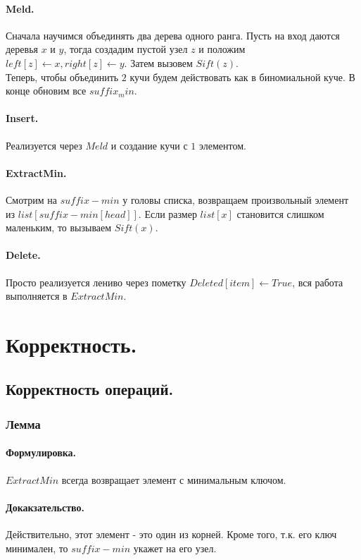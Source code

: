 \documentclass{article}
\begin{document}
		\paragraph{Meld.} 
		Сначала научимся объединять два дерева одного ранга. Пусть на вход даются деревья $x$ и $y$, тогда создадим пустой узел $z$ и положим $left[z] \leftarrow x, right[z] \leftarrow y$. Затем вызовем $Sift(z)$. \\
		Теперь, чтобы объединить $2$ кучи будем действовать как в биномиальной куче. В конце обновим все $suffix_min$.
		\paragraph{Insert.} 
		Реализуется через $Meld$ и создание кучи с $1$ элементом.
		\paragraph{ExtractMin.} Смотрим на $suffix-min$ у головы списка, возвращаем произвольный элемент из $list[suffix-min[head]]$. Если размер $list[x]$ становится слишком маленьким, то вызываем $Sift(x)$.
		\paragraph{Delete.} 
		Просто реализуется лениво через пометку $Deleted[item] \leftarrow True$, вся работа выполняется в $ExtractMin$.
	\section{Корректность.}
	\subsection{Корректность операций.} 
	\subsubsection{Лемма }
		\paragraph{Формулировка.}
		$ExtractMin$ всегда возвращает элемент с минимальным ключом.
		\paragraph{Докакзательство.}		
		Действительно, этот элемент - это один из корней. Кроме того, т.к. его ключ минимален, то $suffix-min$ укажет на его узел. 
		
\end{document}
